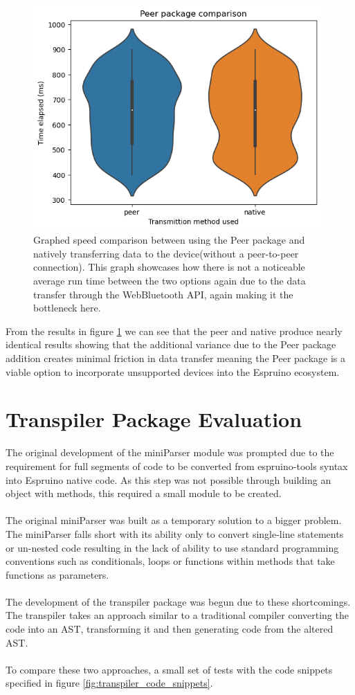 \documentclass{l4proj}
\begin{document}
\begin{figure}[H]
    \centering
    \includegraphics[width=11cm]{dissertation/images/peer-native-comparison.png}
    \caption{Graphed speed comparison between using the Peer package and natively transferring data to the device(without a peer-to-peer connection). This graph showcases how there is not a noticeable average run time between the two options again due to the data transfer through the WebBluetooth API, again making it the bottleneck here.}
    \label{fig:peer-native-speed-comparison}
\end{figure}

From the results in figure \ref{fig:peer-native-speed-comparison} we can see that the peer and native produce nearly identical results showing that the additional variance due to the Peer package addition creates minimal friction in data transfer meaning the Peer package is a viable option to incorporate unsupported devices into the Espruino ecosystem.

\section{Transpiler Package Evaluation}

The original development of the miniParser module was prompted due to the requirement for full segments of code to be converted from espruino-tools syntax into Espruino native code. As this step was not possible through building an object with methods, this required a small module to be created.
\\ \\
The original miniParser was built as a temporary solution to a bigger problem. The miniParser falls short with its ability only to convert single-line statements or un-nested code resulting in the lack of ability to use standard programming conventions such as conditionals, loops or functions within methods that take functions as parameters. 
\\ \\ 
The development of the transpiler package was begun due to these shortcomings. The transpiler takes an approach similar to a traditional compiler converting the code into an AST, transforming it and then generating code from the altered AST.
\\ \\ 
To compare these two approaches, a small set of tests with the code snippets specified in figure \ref{fig:transpiler_code_snippets}.
\end{document}
